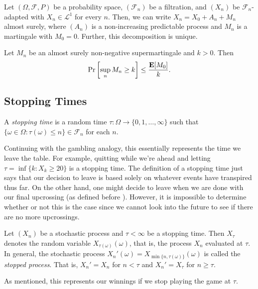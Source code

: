 \begin{lemma}
	Let $(\Omega,\mathcal{F},P)$ be a probability space, $(\mathcal{F}_n)$ be a filtration, and $(X_n)$ be $\mathcal{F}_n$-adapted with $X_n\in\mathcal{L}^1$ for every $n$. Then, we can write $X_n = X_0 + A_n + M_n$ almost surely, where $(A_n)$ is a non-increasing predictable process and $M_n$ is a martingale with $M_0=0$. Further, this decomposition is unique.
\end{lemma}

\begin{lemma}
	Let $M_n$ be an almost surely non-negative supermartingale and $k>0$. Then
	\[ \Pr\left[\sup_n M_n \geq k\right] \leq \frac{\textbf{E}[M_0]}{k}. \]
\end{lemma}

\subsection{Stopping Times}

\begin{definition}
	A \textit{stopping time} is a random time $\tau:\Omega\to\{0,1,\ldots,\infty\}$ such that $\{\omega\in\Omega : \tau(\omega)\leq n\}\in\mathcal{F}_n$ for each $n$.
\end{definition}

Continuing with the gambling analogy, this essentially represents the time we leave the table. For example, quitting while we're ahead and letting $\tau=\inf\{k : X_k \geq 20\}$ is a stopping time. The definition of a stopping time just says that our decision to leave is based solely on whatever events have transpired thus far. On the other hand, one might decide to leave when we are done with our final upcrossing (as defined before ). However, it is impossible to determine whether or not this is the case since we cannot look into the future to see if there are no more upcrossings.

\begin{definition}
	Let $(X_n)$ be a stochastic process and $\tau<\infty$ be a stopping time. Then $X_\tau$ denotes the random variable $X_{\tau(\omega)}(\omega)$, that is, the process $X_n$ evaluated at $\tau$. In general, the stochastic process $X_n'(\omega) = X_{\min\{n,\tau(\omega)\}}(\omega)$ is called the \textit{stopped process}. That is, $X_n'=X_n$ for $n<\tau$ and $X_n' = X_\tau$ for $n\geq\tau$.
\end{definition}

As mentioned, this represents our winnings if we stop playing the game at $\tau$.

